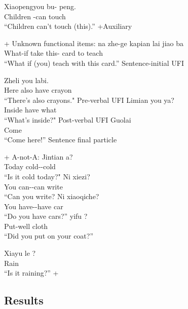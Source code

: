 \bxl
\gll Xiaopengyou bu- peng.\\
Children \Neg-can touch\\
\trans ``Children can't touch (this).'' \hfill +Auxiliary
\exl
\eex

+ Unknown functional items:
\bxl
\gll {} na zhe-ge kapian lai jiao ba\\
What-if take this-\Cl{} card to teach \Sfp{}\\
\trans ``What if (you) teach with this card.''  \hfill Sentence-initial UFI

\ex
\gll Zheli  you labi.\\
Here also have crayon\\
\trans ``There's also crayons." \hfill Pre-verbal UFI
\ex
\gll  Limian you  ya?\\
Inside have what \Sfp{}\\
\trans ``What's inside?" \hfill Post-verbal UFI
\ex 
\gll Guolai \\
Come \Sfp{}\\
\trans ``Come here!'' \hfill Sentence final particle
\exl
\eex

+ A-not-A: 
\bxl
\gll Jintian  a?\\
Today cold-\Neg-cold \Sfp{}\\
\trans ``Is it cold today?" \hfill {}
\ex 
\gll Ni  xiezi?\\
You can-\Neg-can write\\
\trans ``Can you write? \hfill {}
\ex \gll Ni  xiaoqiche?\\
You have-\Neg-have car\\
\trans ``Do you have cars?'' \hfill {}
\ex 
\gll {} yifu ?\\
Put-well cloth \Neg{}\\
\trans ``Did you put on your coat?'' \hfill {}
\exl
\eex

\gll Xiayu le ?\\
Rain \Asp{} \\
\trans ``Is it raining?'' \hfill +
\eex

\subsection{Results}
\label{sec:mancl:corpus:results}

